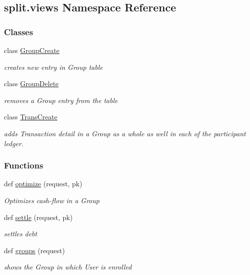 \hypertarget{namespacesplit_1_1views}{}\subsection{split.\+views Namespace Reference}
\label{namespacesplit_1_1views}
\subsubsection*{Classes}
\begin{DoxyCompactItemize}
\item 
class \hyperlink{classsplit_1_1views_1_1GroupCreate}{Group\+Create}
\begin{DoxyCompactList}\small\item\em creates new entry in Group table \end{DoxyCompactList}\item 
class \hyperlink{classsplit_1_1views_1_1GroupDelete}{Group\+Delete}
\begin{DoxyCompactList}\small\item\em removes a Group entry from the table \end{DoxyCompactList}\item 
class \hyperlink{classsplit_1_1views_1_1TransCreate}{Trans\+Create}
\begin{DoxyCompactList}\small\item\em adds Transaction detail in a Group as a whole as well in each of the participant ledger. \end{DoxyCompactList}\end{DoxyCompactItemize}
\subsubsection*{Functions}
\begin{DoxyCompactItemize}
\item 
def \hyperlink{namespacesplit_1_1views_af11b16cc5761572469c76c3bcb219bc9}{optimize} (request, pk)
\begin{DoxyCompactList}\small\item\em Optimizes cash-\/flow in a Group \end{DoxyCompactList}\item 
def \hyperlink{namespacesplit_1_1views_aabff0365b58e8c915cec74ee02a2ae12}{settle} (request, pk)
\begin{DoxyCompactList}\small\item\em settles debt \end{DoxyCompactList}\item 
def \hyperlink{namespacesplit_1_1views_a419d7fc72bf890d32aba4fc21c7568d6}{groups} (request)
\begin{DoxyCompactList}\small\item\em shows the Group in which User is enrolled \end{DoxyCompactList}\end{DoxyCompactItemize}


